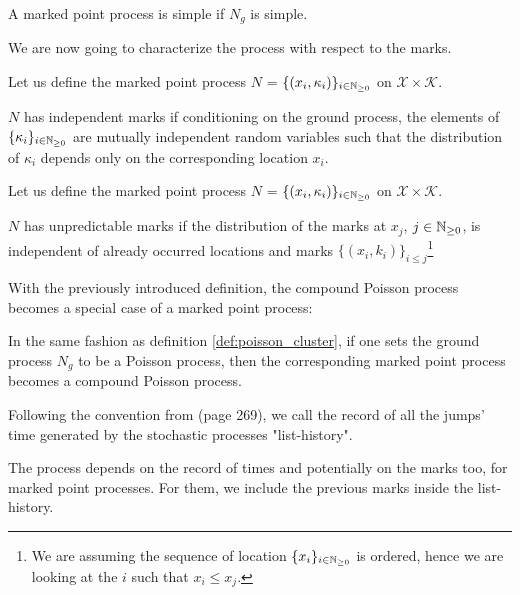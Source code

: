 \begin{definition}
A marked point process is simple if $N_g$ is simple.
\end{definition}

We are now going to characterize the process with respect to the marks. 

\begin{definition}
Let us define the marked point process $N$  = $\{  (x_i, \kappa_i)  \}_{ i \in \mathbb{N}_{\geq 0}}$ on $\mathcal X \times \mathcal K$. 

$N$ has independent marks if conditioning on the ground process, the elements of $\{  \kappa_i  \}_{ i \in \mathbb{N}_{\geq 0}}$ are mutually independent random variables such that the distribution of $\kappa_i$  depends only on the corresponding location $x_i$. 
\end{definition}


\begin{definition}
Let us define the marked point process $N$  = $\{  (x_i, \kappa_i)  \}_{ i \in \mathbb{N}_{\geq 0}}$ on $\mathcal X \times \mathcal K$. 

$N$ has unpredictable marks if the distribution of the marks at $x_j$, $j \in \mathbb{N}_{\geq 0}$, is independent of already occurred locations and marks $\{ (x_i, k_i) \}_{i \leq j}$\footnote{We are assuming the sequence of location $\{ x_i \}_{ i \in \mathbb{N}_{\geq 0}}$ is ordered, hence we are looking at the $i$ such that $x_i \leq x_j$.}
\end{definition}


With the previously introduced definition, the compound Poisson process becomes a special case of a marked point process:

\begin{definition}
In the same fashion as definition \ref{def:poisson_cluster}, if one sets the ground process $N_g$ to be a Poisson process, then the corresponding marked point process becomes a compound Poisson process.
\end{definition}



Following the convention from \cite{daley} (page 269), we call the record of all the jumps' time generated by the stochastic processes "list-history". 

The process depends on the record of times and potentially on the marks too, for marked point processes. For them, we include the previous marks inside the list-history.



